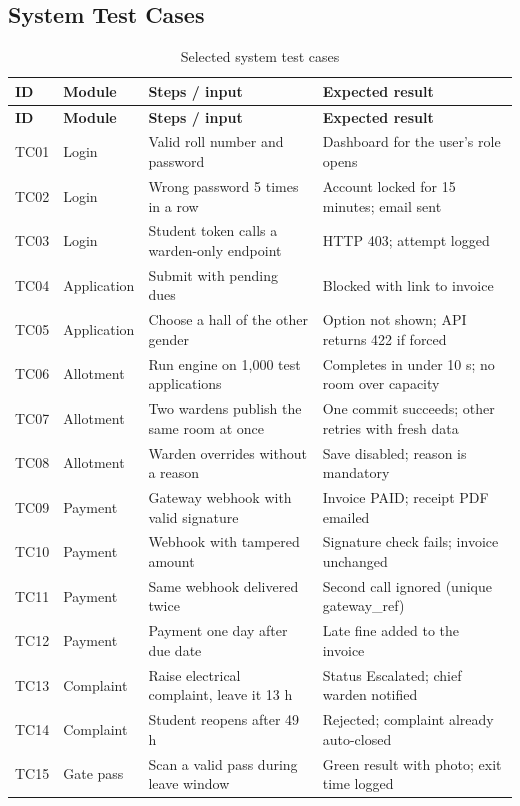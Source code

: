 \documentclass[11pt,a4paper]{report}
\begin{document}
\subsection{System Test Cases}
\begin{longtable}{p{0.9cm}p{2.1cm}p{5.6cm}p{5.6cm}}
\caption{Selected system test cases}\label{tab:tc}\\
\toprule
\textbf{ID} & \textbf{Module} & \textbf{Steps / input} & \textbf{Expected result}\\
\midrule\endfirsthead
\toprule
\textbf{ID} & \textbf{Module} & \textbf{Steps / input} & \textbf{Expected result}\\
\midrule\endhead
TC01 & Login & Valid roll number and password & Dashboard for the user's role opens\\
TC02 & Login & Wrong password 5 times in a row & Account locked for 15 minutes; email sent\\
TC03 & Login & Student token calls a warden-only endpoint & HTTP 403; attempt logged\\
TC04 & Application & Submit with pending dues & Blocked with link to invoice\\
TC05 & Application & Choose a hall of the other gender & Option not shown; API returns 422 if forced\\
TC06 & Allotment & Run engine on 1,000 test applications & Completes in under 10 s; no room over capacity\\
TC07 & Allotment & Two wardens publish the same room at once & One commit succeeds; other retries with fresh data\\
TC08 & Allotment & Warden overrides without a reason & Save disabled; reason is mandatory\\
TC09 & Payment & Gateway webhook with valid signature & Invoice PAID; receipt PDF emailed\\
TC10 & Payment & Webhook with tampered amount & Signature check fails; invoice unchanged\\
TC11 & Payment & Same webhook delivered twice & Second call ignored (unique gateway\_ref)\\
TC12 & Payment & Payment one day after due date & Late fine added to the invoice\\
TC13 & Complaint & Raise electrical complaint, leave it 13 h & Status Escalated; chief warden notified\\
TC14 & Complaint & Student reopens after 49 h & Rejected; complaint already auto-closed\\
TC15 & Gate pass & Scan a valid pass during leave window & Green result with photo; exit time logged\\

\end{longtable}
\end{document}
